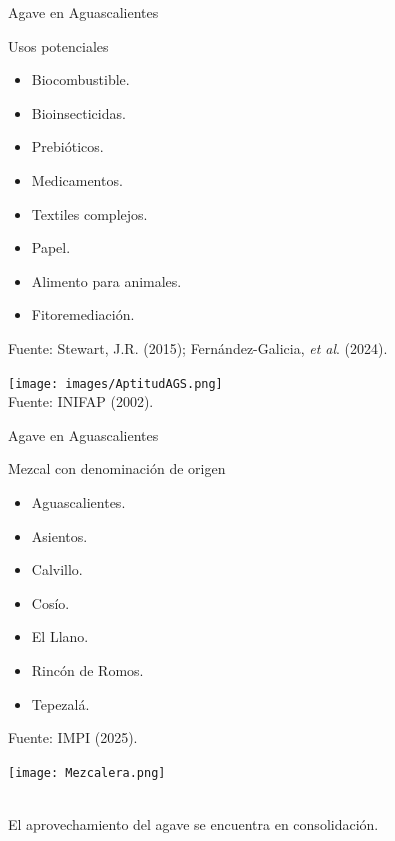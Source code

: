 \documentclass[aspectratio=169]{beamer}
\begin{document}
\begin{frame}{Agave en Aguascalientes}
	\vspace{-1cm}
	\begin{minipage}{0.5\textwidth}
		\begin{block}{Usos potenciales}
			\begin{itemize}
				\item Biocombustible.
				\item Bioinsecticidas.
				\item Prebióticos.
				\item Medicamentos.
				\item Textiles complejos.
				\item Papel.
				\item Alimento para animales.
				\item Fitoremediación.
			\end{itemize}
			{\scriptsize Fuente: Stewart, J.R. (2015); Fernández-Galicia, \textit{et al}. (2024).}
		\end{block}
	\end{minipage}%
	\begin{minipage}{0.5\textwidth}
		\centering\texttt{[image: images/AptitudAGS.png]}\\\hfill {\scriptsize Fuente: INIFAP (2002).}
	\end{minipage}%
\end{frame}

\begin{frame}{Agave en Aguascalientes}
	\vspace{-1cm}\begin{minipage}{0.5\textwidth}
		\begin{block}{Mezcal con denominación de origen}
			\begin{itemize}
				\item Aguascalientes.
				\item Asientos.
				\item Calvillo.
				\item Cosío.
				\item El Llano.
				\item Rincón de Romos.
				\item Tepezalá.
			\end{itemize}
			{\scriptsize Fuente: IMPI (2025).}
		\end{block}
	\end{minipage}%
\begin{minipage}{0.5\textwidth}
\centering	\texttt{[image: Mezcalera.png]}
\end{minipage}
\,\\
\centering \pause El aprovechamiento del agave se encuentra en consolidación.
\end{frame}
\end{document}
